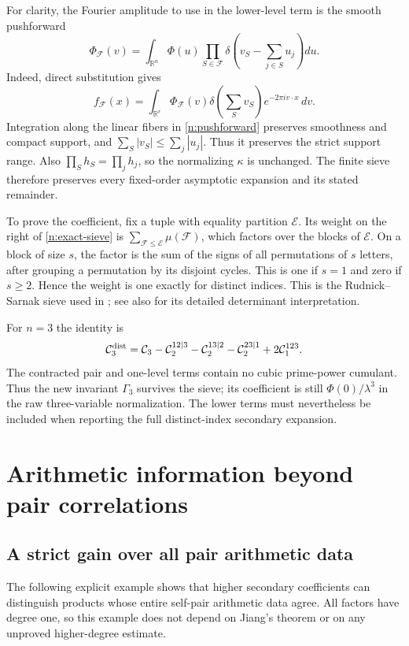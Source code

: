\documentclass[11pt]{article}
\numberwithin{equation}{section}
\theoremstyle{remark}
\newcommand{\R}{\mathbb R}
\begin{document}
For clarity, the Fourier amplitude to use in the lower-level term is
the smooth pushforward
\begin{equation}\label{n:pushforward}
 \Phi_{\mathcal F}(v)=\int_{\R^n}\Phi(u)
       \prod_{S\in\mathcal F}
             \delta\!\left(v_S-\sum_{j\in S}u_j\right)du.
\end{equation}
Indeed, direct substitution gives
\[
 f_{\mathcal F}(x)=\int_{\R^r}\Phi_{\mathcal F}(v)
       \delta\!\left(\sum_Sv_S\right)e^{-2\pi i v\cdot x}\,dv.
\]
Integration along the linear fibers in \eqref{n:pushforward} preserves
smoothness and compact support, and
$\sum_S|v_S|\le\sum_j|u_j|$. Thus it preserves the strict support
range. Also $\prod_Sh_S=\prod_jh_j$, so the normalizing $\kappa$ is
unchanged. The finite sieve therefore preserves every fixed-order
asymptotic expansion and its stated remainder.

To prove the coefficient, fix a tuple with equality partition
$\mathcal E$. Its weight on the right of \eqref{n:exact-sieve} is
$\sum_{\mathcal F\le\mathcal E}\mu(\mathcal F)$, which factors over
the blocks of $\mathcal E$. On a block of size $s$, the factor is the
sum of the signs of all permutations of $s$ letters, after grouping a
permutation by its disjoint cycles. This is one if $s=1$ and zero if
$s\ge2$. Hence the weight is one exactly for distinct indices.
This is the Rudnick--Sarnak sieve used in \cite{RS,LY02}; see also
\cite{WY} for its detailed determinant interpretation.

For $n=3$ the identity is
\[
 \mathcal C_3^{\rm dist}
 =\mathcal C_3-\mathcal C_2^{12|3}
                   -\mathcal C_2^{13|2}-\mathcal C_2^{23|1}
                   +2\mathcal C_1^{123}.
\]
The contracted pair and one-level terms contain no cubic prime-power
cumulant. Thus the new invariant $\Gamma_3$ survives the sieve; its
coefficient is still $\Phi(0)/\lambda^3$ in the raw three-variable
normalization. The lower terms must nevertheless be included when
reporting the full distinct-index secondary expansion.


\section{Arithmetic information beyond pair correlations}\label{sec:information}
\subsection{A strict gain over all pair arithmetic data}
The following explicit example shows that higher secondary coefficients
can distinguish products whose entire self-pair arithmetic data agree.
All factors have degree one, so this example does not depend on Jiang's
theorem or on any unproved higher-degree estimate.
\end{document}
